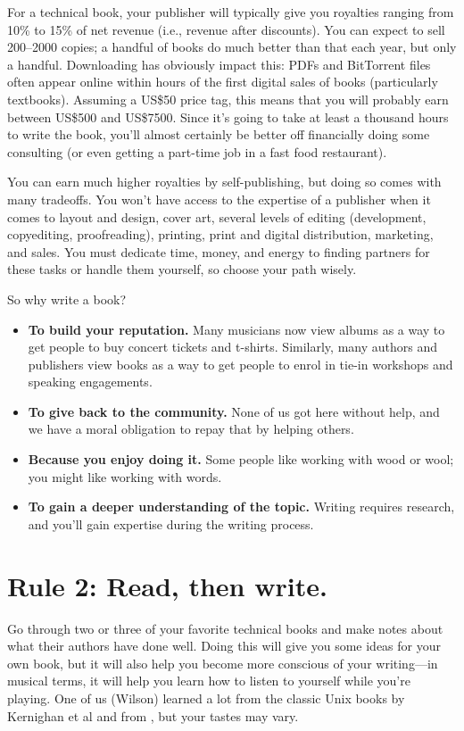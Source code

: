 \documentclass[10pt,letterpaper]{article}
\begin{document}
For a technical book, your publisher will typically give you royalties
ranging from 10\% to 15\% of net revenue (i.e., revenue after
discounts).  You can expect to sell 200–2000 copies; a handful of
books do much better than that each year, but only a handful.
Downloading has obviously impact this: PDFs and BitTorrent files often
appear online within hours of the first digital sales of books
(particularly textbooks).  Assuming a US\$50 price tag, this means
that you will probably earn between US\$500 and US\$7500.  Since it's
going to take at least a thousand hours to write the book, you'll
almost certainly be better off financially doing some consulting (or
even getting a part-time job in a fast food restaurant).

You can earn much higher royalties by self-publishing, but doing so
comes with many tradeoffs.  You won't have access to the expertise of
a publisher when it comes to layout and design, cover art, several
levels of editing (development, copyediting, proofreading), printing,
print and digital distribution, marketing, and sales.  You must
dedicate time, money, and energy to finding partners for these tasks
or handle them yourself, so choose your path wisely.

So why write a book?

\begin{itemize}
\item
  \textbf{To build your reputation.}  Many musicians now view albums
  as a way to get people to buy concert tickets and t-shirts.
  Similarly, many authors and publishers view books as a way to get
  people to enrol in tie-in workshops and speaking engagements.
\item
  \textbf{To give back to the community.}  None of us got here without
  help, and we have a moral obligation to repay that by helping
  others.
\item
  \textbf{Because you enjoy doing it.}  Some people like working with
  wood or wool; you might like working with words.
\item
  \textbf{To gain a deeper understanding of the topic.}  Writing
  requires research, and you'll gain expertise during the writing
  process.
\end{itemize}

\section*{Rule 2: Read, then write.}

Go through two or three of your favorite technical books and make
notes about what their authors have done well.  Doing this will give
you some ideas for your own book, but it will also help you become
more conscious of your writing—in musical terms, it will help you
learn how to listen to yourself while you're playing.  One of us
(Wilson) learned a lot from the classic Unix books by Kernighan et al
\cite{Ke1979,Ke1981,Ke1983,Ke1988} and from \cite{Ud1999}, but your
tastes may vary.
\end{document}
